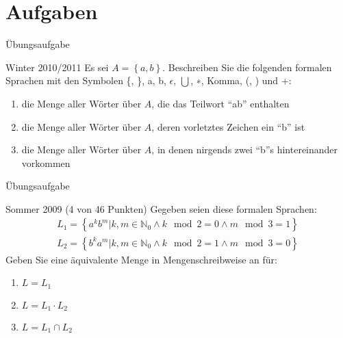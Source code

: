 \section{Aufgaben}
\begin{frame}{Übungsaufgabe}
    \begin{exampleblock}{Winter 2010/2011}
        Es sei $A = \left\{a, b\right\}$. Beschreiben Sie die folgenden formalen Sprachen mit den Symbolen \{, \}, a, b, $\epsilon$, $\bigcup$, ∗, Komma, (, ) und +:
        \begin{enumerate}
            \item die Menge aller Wörter über $A$, die das Teilwort "`ab"' enthalten
            \item die Menge aller Wörter über $A$, deren vorletztes Zeichen ein "`b"' ist
            \item die Menge aller Wörter über $A$, in denen nirgends zwei "`b"'s hintereinander vorkommen
        \end{enumerate}
    \end{exampleblock}
\end{frame}
\begin{frame}{Übungsaufgabe}
    \begin{exampleblock}{Sommer 2009 (4 von 46 Punkten)}
        Gegeben seien diese formalen Sprachen:
        \begin{align*}
            L_1 = \left\{ a^k b^m | k, m \in \mathbb{N}_0 \wedge k \mod 2 = 0 \wedge m \mod 3 = 1\right\}\\
            L_2 = \left\{ b^k a^m | k, m \in \mathbb{N}_0 \wedge k \mod 2 = 1 \wedge m \mod 3 = 0\right\}
        \end{align*}
        Geben Sie eine äquivalente Menge in Mengenschreibweise an für:
        \begin{enumerate}
            \item $L = L_1$
            \item $L = L_1 \cdot L_2$
            \item $L = L_1 \cap L_2$
        \end{enumerate}
    \end{exampleblock}
\end{frame}

